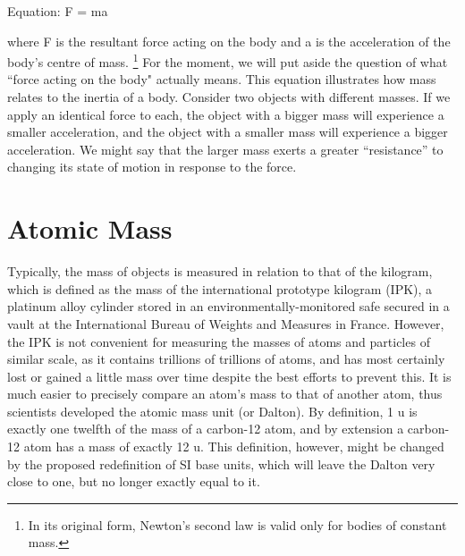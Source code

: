 \documentclass{book}
\begin{document}
	Equation: F = ma
	
	where F is the resultant force acting on the body and a is the acceleration of the body's centre of mass. \footnote{ In its original form, Newton's second law is valid only for bodies of constant mass.} For the moment, we will put aside the question of what ``force acting on the body" actually means. This equation illustrates how mass relates to the inertia of a body. Consider two objects with different masses. If we apply an identical force to each, the object with a bigger mass will experience a smaller acceleration, and the object with a smaller mass will experience a bigger acceleration. We might say that the larger mass exerts a greater ``resistance'' to changing its state of motion in response to the force.
	
	\section{Atomic Mass}
	Typically, the mass of objects is measured in relation to that of the kilogram, which is defined as the mass of the international prototype kilogram (IPK), a platinum alloy cylinder stored in an environmentally-monitored safe secured in a vault at the International Bureau of Weights and Measures in France. However, the IPK is not convenient for measuring the masses of atoms and particles of similar scale, as it contains trillions of trillions of atoms, and has most certainly lost or gained a little mass over time despite the best efforts to prevent this. It is much easier to precisely compare an atom's mass to that of another atom, thus scientists developed the atomic mass unit (or Dalton). By definition, 1 u is exactly one twelfth of the mass of a carbon-12 atom, and by extension a carbon-12 atom has a mass of exactly 12 u. This definition, however, might be changed by the proposed redefinition of SI base units, which will leave the Dalton very close to one, but no longer exactly equal to it.
	
\end{document}
